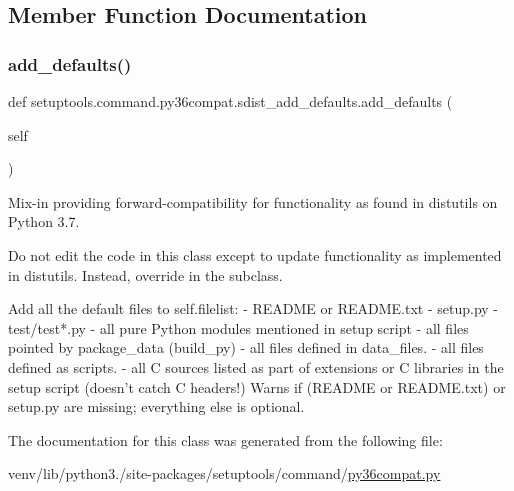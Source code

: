 \subsection{Member Function Documentation}
\mbox{\label{classsetuptools_1_1command_1_1py36compat_1_1sdist__add__defaults_a91682de24cf13a3d7552a8b35db9a04a}} 
\subsubsection{\texorpdfstring{add\+\_\+defaults()}{add\_defaults()}}
{\footnotesize\ttfamily def setuptools.\+command.\+py36compat.\+sdist\+\_\+add\+\_\+defaults.\+add\+\_\+defaults (\begin{DoxyParamCaption}\item[{}]{self }\end{DoxyParamCaption})}

\begin{DoxyVerb}Mix-in providing forward-compatibility for functionality as found in
distutils on Python 3.7.

Do not edit the code in this class except to update functionality
as implemented in distutils. Instead, override in the subclass.
\end{DoxyVerb}
\begin{DoxyVerb}Add all the default files to self.filelist:
  - README or README.txt
  - setup.py
  - test/test*.py
  - all pure Python modules mentioned in setup script
  - all files pointed by package_data (build_py)
  - all files defined in data_files.
  - all files defined as scripts.
  - all C sources listed as part of extensions or C libraries
    in the setup script (doesn't catch C headers!)
Warns if (README or README.txt) or setup.py are missing; everything
else is optional.
\end{DoxyVerb}
 

The documentation for this class was generated from the following file\+:\begin{DoxyCompactItemize}
\item 
venv/lib/python3./site-\/packages/setuptools/command/\hyperlink{py36compat_8py}{py36compat.\+py}\end{DoxyCompactItemize}
